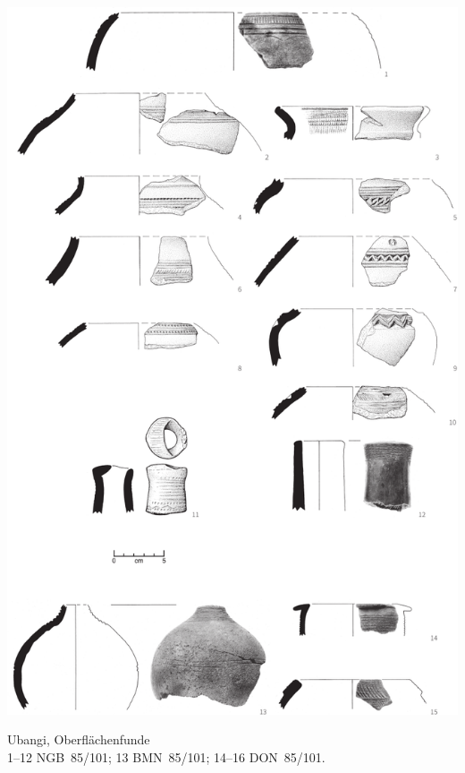 \begin{pl}[H]
	\includegraphics{plt/Taf7.pdf}
	\vspace{.75em}\caption{\mbox{Ubangi}, Oberflächenfunde \\ 1--12 NGB~85/101; 13 BMN~85/101; 14--16 DON~85/101.}
	\label{pl:7}
\end{pl}

